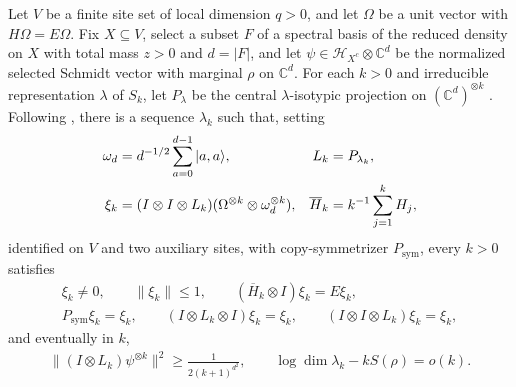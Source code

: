 \begin{lemma}
    \label{thm:al_global_schmidt_bell_prevector}
    \leanok
    Let $V$ be a finite site set of local dimension $q>0$, and let $\Omega$ be a
    unit vector with $H\Omega=E\Omega$. Fix $X\subseteq V$, select a subset $F$
    of a spectral basis of the reduced density on $X$ with total mass $z>0$ and
    $d=|F|$, and let $\psi\in\mathcal H_{X^c}\otimes\mathbb C^d$ be the
    normalized selected Schmidt vector with marginal $\rho$ on $\mathbb C^d$.
    For each $k>0$ and irreducible representation $\lambda$ of $S_k$, let
    $P_\lambda$ be the central $\lambda$-isotypic projection on
    $(\mathbb C^d)^{\otimes k}$ \cite[Section~6]{OpenAI2026AreaLaw}. Following
    \cite[Section~8 and Section~9, lines~50--59]{OpenAI2026AreaLaw}, there is a
    sequence $\lambda_k$ such that, setting
    \begin{align}
        \omega_d                                         & =d^{-1/2}\sum_{a=0}^{d-1}|a,a\rangle,        &
        L_k                                              & =P_{\lambda_k},                       \notag   \\
        \xi_k                                            & =(I\otimes I\otimes L_k)
        (\Omega^{\otimes k}\otimes\omega_d^{\otimes k}), &
        \overline H_k                                    & =k^{-1}\sum_{j=1}^k H_j,
        \label{eq:al_schmidt_bell_defs}
    \end{align}
    identified on $V$ and two auxiliary sites, with copy-symmetrizer
    $P_{\mathrm{sym}}$, every $k>0$ satisfies
    \begin{align}
        \xi_k\ne0,\qquad \|\xi_k\|\le1,\qquad
        (\overline H_k\otimes I)\xi_k=E\xi_k,
        \label{eq:al_schmidt_bell_energy} \\
        P_{\mathrm{sym}}\xi_k=\xi_k,\qquad
        (I\otimes L_k\otimes I)\xi_k=\xi_k,\qquad
        (I\otimes I\otimes L_k)\xi_k=\xi_k,
        \label{eq:al_schmidt_bell_invariance}
    \end{align}
    and eventually in $k$,
    \begin{align}
        \|(I\otimes L_k)\psi^{\otimes k}\|^2
        \ge\frac1{2(k+1)^{d^2}},\qquad
        \log\dim\lambda_k-kS(\rho)=o(k).
        \label{eq:al_schmidt_bell_asymptotics}
    \end{align}
\end{lemma}
